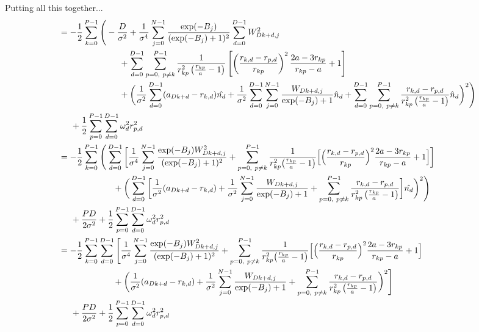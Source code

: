\documentclass[12pt]{article}
\begin{document}
Putting all this together...
\begin{align*}
&= -\frac{1}{2} \sum_{k=0}^{P-1} 
\Bigg( -\frac{D}{\sigma^2}  + \frac{1}{\sigma^4} \sum_{j=0}^{N-1} \frac{\exp(-B_j)}{(\exp(-B_j)+1)^2} \sum_{d=0}^{D-1} W_{Dk+d,j}^2  \\
& \hspace*{2.5 cm} 
+ \sum_{d=0}^{D-1} \sum_{p=0, \ p\neq k}^{P-1}  \frac{1}{r_{kp}^2 \left( \frac{r_{kp}}{a} -1 \right)}
\left[ 
\left( \frac{r_{k,d}-r_{p,d}}{r_{kp}} \right)^2 \frac{2a-3r_{kp}}{r_{kp}-a}
 +1
\right]\\
& \hspace*{2.5 cm}
 + \bigg( \frac{1}{\sigma^2} \sum_{d=0}^{D-1} (a_{Dk+d} -r_{k,d} ) \hat{n_{d}}  
 + \frac{1}{\sigma^2} \sum_{d=0}^{D-1} \sum_{j=0}^{N-1}  \frac{W_{Dk+d,j}}{\exp(-B_j)+1}   \hat{n}_d  
 + \sum_{d=0}^{D-1} \sum_{p=0, \ p\neq k}^{P-1} \frac{r_{k,d}-r_{p,d}}{r_{kp}^2 \left( \frac{r_{kp}}{a} -1 \right)} \hat{n}_d
 \bigg)^2 \Bigg)\\
& \hspace*{.5 cm} + \frac{1}{2} \sum_{p=0}^{P-1} \sum_{d=0}^{D-1} \omega_d^2r_{p,d}^2\\
&= -\frac{1}{2} \sum_{k=0}^{P-1} 
\Bigg( \sum_{d=0}^{D-1} \bigg[ \frac{1}{\sigma^4} \sum_{j=0}^{N-1} \frac{\exp(-B_j)W_{Dk+d,j}^2}{(\exp(-B_j)+1)^2}
+ \sum_{p=0, \ p\neq k}^{P-1}  \frac{1}{r_{kp}^2 \big( \frac{r_{kp}}{a} -1 \big)}
\Big[ 
\Big( \frac{r_{k,d}-r_{p,d}}{r_{kp}} \Big)^2 \frac{2a-3r_{kp}}{r_{kp}-a}
 +1
\Big]  \bigg] \\
& \hspace*{2.25 cm}
+ \bigg( \sum_{d=0}^{D-1} \bigg[
\frac{1}{\sigma^2}(a_{Dk+d} -r_{k,d} )
+\frac{1}{\sigma^2}\sum_{j=0}^{N-1}  \frac{W_{Dk+d,j}}{\exp(-B_j)+1}
+\sum_{p=0, \ p\neq k}^{P-1} \frac{r_{k,d}-r_{p,d}}{r_{kp}^2 \left( \frac{r_{kp}}{a} -1 \right)}
 \bigg] \hat{n_{d}}
 \bigg)^2 \Bigg)\\
& \hspace*{.5 cm} + \frac{PD}{2\sigma^2}+ \frac{1}{2}\sum_{p=0}^{P-1} \sum_{d=0}^{D-1} \omega_d^2r_{p,d}^2\\
&= -\frac{1}{2} \sum_{k=0}^{P-1} \sum_{d=0}^{D-1}
\Bigg[ \frac{1}{\sigma^4} \sum_{j=0}^{N-1} \frac{\exp(-B_j)W_{Dk+d,j}^2}{(\exp(-B_j)+1)^2}
+ \sum_{p=0, \ p\neq k}^{P-1}  \frac{1}{r_{kp}^2 \big( \frac{r_{kp}}{a} -1 \big)}
\Big[ 
\Big( \frac{r_{k,d}-r_{p,d}}{r_{kp}} \Big)^2 \frac{2a-3r_{kp}}{r_{kp}-a}
 +1
\Big]  \\
& \hspace*{2.25 cm}
+ \bigg( 
\frac{1}{\sigma^2}(a_{Dk+d} -r_{k,d} )
+\frac{1}{\sigma^2}\sum_{j=0}^{N-1}  \frac{W_{Dk+d,j}}{\exp(-B_j)+1}
+\sum_{p=0, \ p\neq k}^{P-1} \frac{r_{k,d}-r_{p,d}}{r_{kp}^2 \left( \frac{r_{kp}}{a} -1 \right)}
 \bigg)^2  \Bigg]\\
& \hspace*{.5 cm} + \frac{PD}{2\sigma^2}+\frac{1}{2} \sum_{p=0}^{P-1} \sum_{d=0}^{D-1} \omega_d^2r_{p,d}^2\\
\end{align*}
\end{document}

